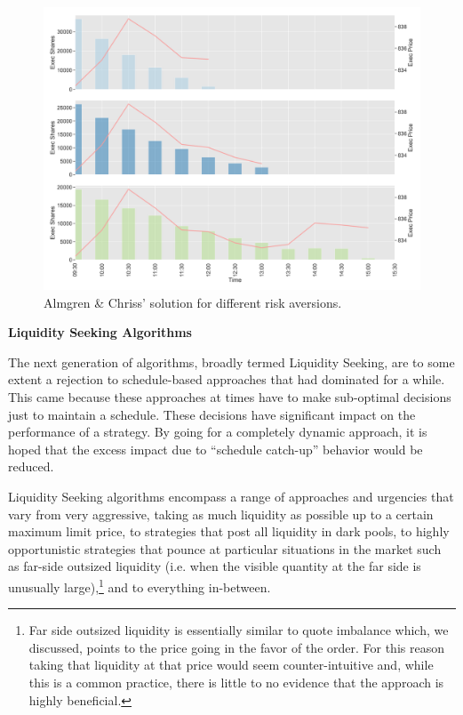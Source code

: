 	\begin{figure}[!ht]
	\centering
	\includegraphics[width=\textwidth]{chapters/chapter_exec_models/figures/is.png} 
	\caption{Almgren \& Chriss' solution for different risk aversions.\label{fig:is}}
	\end{figure}


\noindent\textbf{Liquidity Seeking Algorithms} \twomedskip

The next generation of algorithms, broadly termed Liquidity Seeking, are to some extent a rejection to schedule-based approaches that had dominated for a while. This came because these approaches at times have to make sub-optimal decisions just to maintain a schedule. These decisions have significant impact on the performance of a strategy. By going for a completely dynamic approach, it is hoped that the excess impact due to ``schedule catch-up'' behavior would be reduced.


Liquidity Seeking algorithms encompass a range of approaches and urgencies that vary from very aggressive, taking as much liquidity as possible up to a certain maximum limit price, to strategies that post all liquidity in dark pools, to highly opportunistic strategies that pounce at particular situations in the market such as far-side outsized liquidity (i.e. when the visible quantity at the far side is unusually large),\footnote{Far side outsized liquidity is essentially similar to quote imbalance which, we discussed, points to the price going in the favor of the order. For this reason taking that liquidity at that price would seem counter-intuitive and, while this is a common practice,  there is little to no evidence that the approach is highly beneficial.} and to everything in-between.



